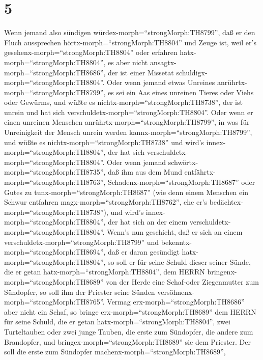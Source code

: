 \hypertarget{section-4}{%
\section{5}\label{section-4}}

 Wenn jemand also sündigen
würdex-morph=``strongMorph:TH8799'', daß er den Fluch aussprechen
hörtx-morph=``strongMorph:TH8804'' und Zeuge ist, weil er's
gesehenx-morph=``strongMorph:TH8804'' oder erfahren
hatx-morph=``strongMorph:TH8804'', es aber nicht
ansagtx-morph=``strongMorph:TH8686'', der ist einer Missetat
schuldigx-morph=``strongMorph:TH8804''.  Oder wenn jemand
etwas Unreines anrührtx-morph=``strongMorph:TH8799'', es sei ein Aas
eines unreinen Tieres oder Viehs oder Gewürms, und wüßte es
nichtx-morph=``strongMorph:TH8738'', der ist unrein und hat sich
verschuldetx-morph=``strongMorph:TH8804''.  Oder wenn er
einen unreinen Menschen anrührtx-morph=``strongMorph:TH8799'', in was
für Unreinigkeit der Mensch unrein werden
kannx-morph=``strongMorph:TH8799'', und wüßte es
nichtx-morph=``strongMorph:TH8738'' und wird's
innex-morph=``strongMorph:TH8804'', der hat sich
verschuldetx-morph=``strongMorph:TH8804''.  Oder wenn jemand
schwörtx-morph=``strongMorph:TH8735'', daß ihm aus dem Mund
entfährtx-morph=``strongMorph:TH8763'',
Schadenx-morph=``strongMorph:TH8687'' oder Gutes zu
tunx-morph=``strongMorph:TH8687'' (wie denn einem Menschen ein Schwur
entfahren magx-morph=``strongMorph:TH8762'', ehe er's
bedächtex-morph=``strongMorph:TH8738''), und wird's
innex-morph=``strongMorph:TH8804'', der hat sich an der einem
verschuldetx-morph=``strongMorph:TH8804''.  Wenn's nun
geschieht, daß er sich an einem
verschuldetx-morph=``strongMorph:TH8799'' und
bekenntx-morph=``strongMorph:TH8694'', daß er daran gesündigt
hatx-morph=``strongMorph:TH8804'',  so soll er für seine
Schuld dieser seiner Sünde, die er getan
hatx-morph=``strongMorph:TH8804'', dem HERRN
bringenx-morph=``strongMorph:TH8689'' von der Herde eine Schaf-oder
Ziegenmutter zum Sündopfer, so soll ihm der Priester seine Sünden
versöhnenx-morph=``strongMorph:TH8765''.  Vermag
erx-morph=``strongMorph:TH8686'' aber nicht ein Schaf, so bringe
erx-morph=``strongMorph:TH8689'' dem HERRN für seine Schuld, die er
getan hatx-morph=``strongMorph:TH8804'', zwei Turteltauben oder zwei
junge Tauben, die erste zum Sündopfer, die andere zum Brandopfer,
 und bringex-morph=``strongMorph:TH8689'' sie dem Priester.
Der soll die erste zum Sündopfer machenx-morph=``strongMorph:TH8689'',
